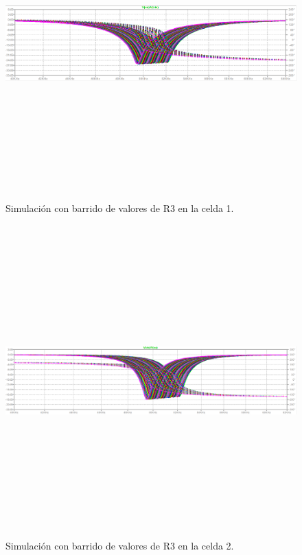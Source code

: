 \begin{figure}[H] %
	\centering	\includegraphics[width=12cm,height=12cm,keepaspectratio]{../EJ4/graficos/etapa1_R3.png}
	\caption{Simulaci\'on con barrido de valores de R3 en la celda 1.}
	\label{celda1_r3}
\end{figure}

\begin{figure}[H] %
	\centering	\includegraphics[width=12cm,height=12cm,keepaspectratio]{../EJ4/graficos/etapa2_R3.png}
	\caption{Simulaci\'on con barrido de valores de R3 en la celda 2.}
	\label{celda2_r3}
\end{figure}

